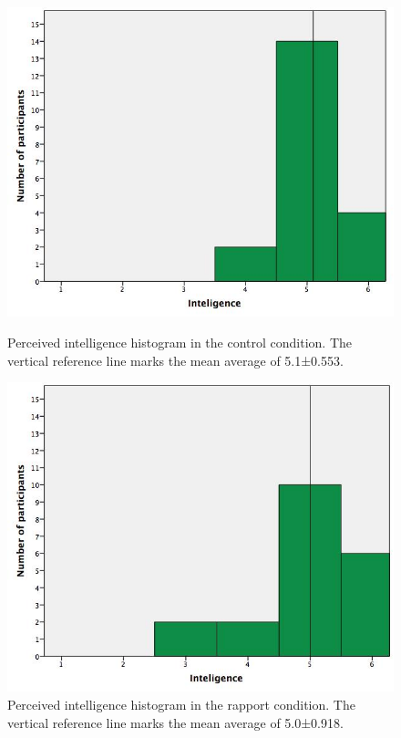\begin{figure}[H]
	\centering
	\begin{minipage}[b]{.45\textwidth}
		\centering
		\includegraphics[width=\textwidth]{images/PerceivedIntelligenceBaseline.jpeg}
		\caption{Perceived intelligence histogram in the control condition. The vertical reference line marks the mean average of 5.1±0.553.}
		\label{fig:intelligence_baseline}
	\end{minipage}
	\hfill
	\begin{minipage}[b]{.45\textwidth}
		\centering
		\includegraphics[width=\textwidth]{images/PerceivedIntelligenceRapport.jpeg}
		\caption{Perceived intelligence histogram in the rapport condition. The vertical reference line marks the mean average of 5.0±0.918.}
		\label{fig:intelligence_rapport}
	\end{minipage}
\end{figure}

